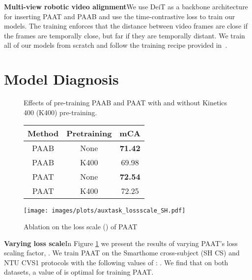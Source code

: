 \documentclass{article}
\begin{document}
\textbf{Multi-view robotic video alignment}\quad We use DeiT as a backbone architecture for inserting PAAT and PAAB and use the time-contrastive loss \cite{sermanet2017tcn_robotalign} to train our models. The training enforces that the distance between video frames are close if the frames are temporally close, but far if they are temporally distant. We train all of our models from scratch and follow the training recipe provided in~\cite{3dtrl}.


\section{Model Diagnosis}
\begin{figure}[htbp]
    \vspace{-3pt}
    \begin{minipage}{0.5\textwidth}
        \centering
        \caption{Effects of pre-training PAAB and PAAT with and without Kinetics 400 (K400) pre-training.}
		\begin{tabular}{c c c}
            \toprule
             \textbf{Method} & \textbf{Pretraining} & \textbf{mCA} \\
            \toprule
            PAAB & None & \textbf{71.42} \\
            PAAB & K400 & 69.98 \\
            \midrule
            PAAT & None & \textbf{72.54} \\
            PAAT & K400 & 72.25 \\
            \bottomrule
        \end{tabular}
		\label{tab:BOTH_pretraining_effects}
    \end{minipage}
    \hfill
    \begin{minipage}{0.46\textwidth}
        \centering
        \texttt{[image: images/plots/auxtask\_lossscale\_SH.pdf]}
        \caption{Ablation on the loss scale () of PAAT}
        \label{fig:lossscale}
    \end{minipage}
    \vspace{-10pt}
\end{figure}

\textbf{Varying loss scale}\quad In Figure \ref{fig:lossscale} we present the results of varying PAAT's loss scaling factor, . We train PAAT on the Smarthome cross-subject (SH CS) and NTU CVS1 protocols with the following values of : . We find that on both datasets, a value of  is optimal for training PAAT.
\end{document}
